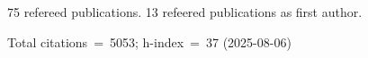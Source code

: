 75 refereed publications. 13 refeered publications as first author.

Total citations~=~5053; h-index~=~37 (2025-08-06)